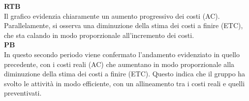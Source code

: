 \begin{flushleft}
\textbf{RTB} \\
Il grafico evidenzia chiaramente un aumento progressivo dei costi (AC). Parallelamente, si osserva una diminuzione della stima dei costi a finire (ETC), che sta calando in modo proporzionale all'incremento dei costi. \\

\textbf{PB} \\
In questo secondo periodo viene confermato l'andamento evidenziato in quello precedente, con i costi reali (AC) che aumentano in modo proporzionale alla diminuzione della stima dei costi a finire (ETC). Questo indica che il gruppo ha svolto le attività in modo efficiente, con un allineamento tra i costi reali e quelli preventivati.
\end{flushleft}

\newpage
